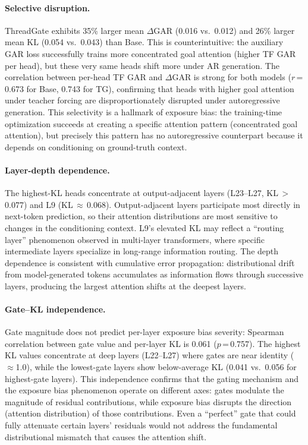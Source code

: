 \paragraph{Selective disruption.} ThreadGate exhibits 35\% larger mean $\Delta$GAR (0.016 vs.\ 0.012) and 26\% larger mean KL (0.054 vs.\ 0.043) than Base. This is counterintuitive: the auxiliary GAR loss successfully trains more concentrated goal attention (higher TF GAR per head), but these very same heads shift more under AR generation. The correlation between per-head TF GAR and $\Delta$GAR is strong for both models ($r$\,=\,0.673 for Base, 0.743 for TG), confirming that heads with higher goal attention under teacher forcing are disproportionately disrupted under autoregressive generation. This selectivity is a hallmark of exposure bias: the training-time optimization succeeds at creating a specific attention pattern (concentrated goal attention), but precisely this pattern has no autoregressive counterpart because it depends on conditioning on ground-truth context.

\paragraph{Layer-depth dependence.} The highest-KL heads concentrate at output-adjacent layers (L23--L27, KL\,$>$\,0.077) and L9 (KL\,$\approx$\,0.068). Output-adjacent layers participate most directly in next-token prediction, so their attention distributions are most sensitive to changes in the conditioning context. L9's elevated KL may reflect a ``routing layer'' phenomenon observed in multi-layer transformers, where specific intermediate layers specialize in long-range information routing. The depth dependence is consistent with cumulative error propagation: distributional drift from model-generated tokens accumulates as information flows through successive layers, producing the largest attention shifts at the deepest layers.

\paragraph{Gate--KL independence.} Gate magnitude does not predict per-layer exposure bias severity: Spearman correlation between gate value and per-layer KL is 0.061 ($p$\,=\,0.757). The highest KL values concentrate at deep layers (L22--L27) where gates are near identity ($\approx$1.0), while the lowest-gate layers show below-average KL (0.041 vs.\ 0.056 for highest-gate layers). This independence confirms that the gating mechanism and the exposure bias phenomenon operate on different axes: gates modulate the magnitude of residual contributions, while exposure bias disrupts the direction (attention distribution) of those contributions. Even a ``perfect'' gate that could fully attenuate certain layers' residuals would not address the fundamental distributional mismatch that causes the attention shift.

